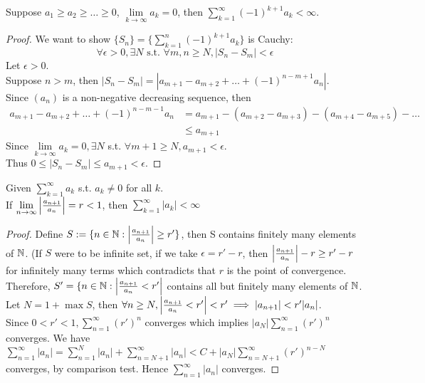 \documentclass[11pt]{article}
\begin{document}
 Suppose $a_1 \geq a_2 \geq \hdots \geq 0$, $\underset{k \rightarrow \infty}{\lim}a_k = 0$, then $\sum_{k=1}^\infty (-1)^{k+1} a_k < \infty$.

\begin{proof}
	We want to show $\{S_n\} = \{\sum_{k=1}^n (-1)^{k+1}a_k\}$ is Cauchy:
	$$\forall \epsilon > 0, \exists N \text{ s.t. } \forall m, n \geq N, |S_n - S_m| < \epsilon$$
	Let $\epsilon > 0$.\\
	Suppose $n > m$, then $|S_n - S_m| = |a_{m+1} - a_{m+2} + \hdots + (-1)^{n-m+1}a_n|$. \\
	Since $(a_n)$ is a non-negative decreasing sequence, then
	\begin{align*}
		a_{m+1} - a_{m+2} + \hdots + (-1)^{n-m-1}a_n &= a_{m+1} - (a_{m+2} - a_{m+3}) - (a_{m+4} - a_{m+5}) - \hdots \\
		&\leq a_{m+1}
	\end{align*}
	Since $\underset{k \rightarrow \infty}{\lim}a_k = 0, \exists N$ s.t. $\forall m + 1 \geq N, a_{m+1} < \epsilon$. \\
	Thus $0 \leq |S_n - S_m| \leq a_{m+1} < \epsilon$.	
	
\end{proof}

 Given $\sum_{k=1}^\infty a_k$ s.t. $a_k \neq 0$ for all $k$. \\
If $\underset{n \rightarrow \infty}{\lim} \left \vert {\frac{a_{n+1}}{a_n}} \right \vert = r < 1$, then $\sum_{k=1}^\infty |a_k|< \infty$ 
\begin{proof}
	Define $S := \{ n\in \mathbb{N}: \left \vert {\frac{a_{n+1}}{a_n}} \right \vert \geq r'\}$, then S contains finitely many elements of $\mathbb{N}$. (If $S$ were to be infinite set, if we take $\epsilon = r' - r$, then $\left \vert {\frac{a_{n+1}}{a_n}} \right \vert - r \geq r' - r$ for infinitely many terms which contradicts that $r$ is the point of convergence.\\
	Therefore, $S' = \{n \in \mathbb{N}: \left \vert {\frac{a_{n+1}}{a_n} < r'} \right \vert$ contains all but finitely many elements of $\mathbb{N}$. Let $N = 1 + \max S$, then $\forall n \geq N,\left \vert {\frac{a_{n+1}}{a_n} < r'} \right \vert < r' \implies |a_{n+1}| < r'|a_n|$. \\
	Since $0 < r' < 1, \sum_{n=1}^\infty (r')^n$ converges which implies $|a_N|\sum_{n=1}^\infty (r')^n$ converges. 
	We have $\sum_{n=1}^\infty |a_n| = \sum_{n=1}^N |a_n| + \sum_{n = N+1}^\infty |a_n| < C + |a_N|\sum_{n=N+1}^\infty (r')^{n-N}$ converges, by comparison test. Hence $\sum_{n=1}^\infty |a_n|$ converges.
\end{proof}
\end{document}
